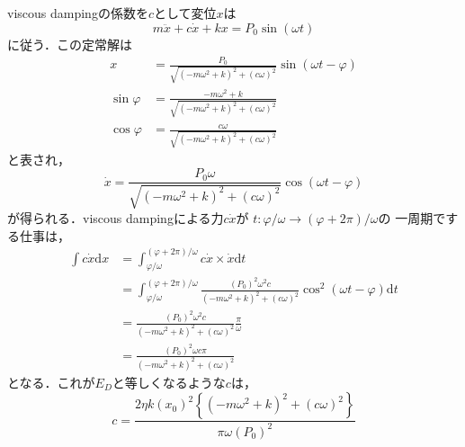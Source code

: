 \documentclass[a4paper]{jsarticle}
\begin{document}
\subsection{}
viscous dampingの係数を$c$として変位$x$は
\begin{equation}
  m \ddot{x} + c \dot{x} + k x = P_0 \sin (\omega t)
\end{equation}
に従う．この定常解は
\begin{align}
  x            & = \frac{P_0}{\sqrt{(-m \omega^2 + k)^2 + (c \omega)^2}}
  \sin (\omega t - \varphi)                                                          \\
  \sin \varphi & = \frac{-m \omega^2 + k}{\sqrt{(-m \omega^2 + k)^2 + (c \omega)^2}} \\
  \cos \varphi & = \frac{c \omega}{\sqrt{(-m \omega^2 + k)^2 + (c \omega)^2}}
\end{align}
と表され，
\begin{equation}
  \dot{x} = \frac{P_0 \omega}{\sqrt{(-m \omega^2 + k)^2 + (c \omega)^2}} \cos (\omega t - \varphi)
\end{equation}
が得られる．viscous dampingによる力$c \dot{x}$が
$t: \varphi/\omega \rightarrow (\varphi + 2 \pi) / \omega$の
一周期でする仕事は，
\begin{equation}
  \begin{aligned}
    \int c \dot{x} \mathrm{d} x
     & = \int_{\varphi / \omega}^{(\varphi + 2 \pi) / \omega}
    c \dot{x} \times \dot{x} \mathrm{d} t                                                            \\
     & =\int_{\varphi / \omega}^{(\varphi + 2 \pi) / \omega}
    \frac{\left(P_0\right)^2 \omega^2 c}{(-m \omega^2 + k)^2 + (c \omega)^2}
    \cos^2 (\omega t - \varphi) \mathrm{d} t                                                         \\
     & = \frac{\left(P_0\right)^2 \omega^2 c}{(-m \omega^2 + k)^2 + (c \omega)^2} \frac{\pi}{\omega} \\
     & = \frac{\left(P_0\right)^2 \omega c \pi}{(-m \omega^2 + k)^2 + (c \omega)^2}
  \end{aligned}
\end{equation}
となる．これが$E_D$と等しくなるような$c$は，
\begin{equation}
  \label{eq:eta_to_c}
  c = \frac{2 \eta k \left(x_0\right)^2
    \left\{(-m \omega^2 + k)^2 + (c \omega)^2\right\}}{\pi \omega \left(P_0\right)^2}
\end{equation}
\end{document}
